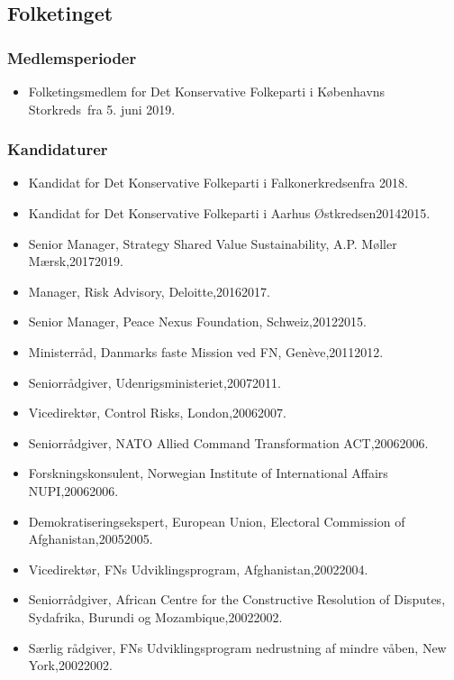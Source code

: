 \documentclass[11pt, a4paper]{awesome-cv}
\begin{document}
\begin{cvletter}
\subsection*{Folketinget}
\subsubsection*{Medlemsperioder}
\begin{itemize}
\item Folketingsmedlem for Det Konservative Folkeparti i Københavns Storkreds fra 5. juni 2019.
\end{itemize}
\subsubsection*{Kandidaturer}
\begin{itemize}
\item Kandidat for Det Konservative Folkeparti i Falkonerkredsenfra 2018.
\item Kandidat for Det Konservative Folkeparti i Aarhus Østkredsen20142015.
\end{itemize}
\begin{itemize}
\item Senior Manager, Strategy  Shared Value Sustainability, A.P. Møller Mærsk,20172019.
\item Manager, Risk Advisory, Deloitte,20162017.
\item Senior Manager, Peace Nexus Foundation, Schweiz,20122015.
\item Ministerråd, Danmarks faste Mission ved FN, Genève,20112012.
\item Seniorrådgiver, Udenrigsministeriet,20072011.
\item Vicedirektør, Control Risks, London,20062007.
\item Seniorrådgiver, NATO Allied Command Transformation ACT,20062006.
\item Forskningskonsulent, Norwegian Institute of International Affairs NUPI,20062006.
\item Demokratiseringsekspert, European Union, Electoral Commission of Afghanistan,20052005.
\item Vicedirektør, FNs Udviklingsprogram, Afghanistan,20022004.
\item Seniorrådgiver, African Centre for the Constructive Resolution of Disputes, Sydafrika, Burundi og Mozambique,20022002.
\item Særlig rådgiver, FNs Udviklingsprogram nedrustning af mindre våben, New York,20022002.

\end{itemize}
\end{cvletter}
\end{document}
